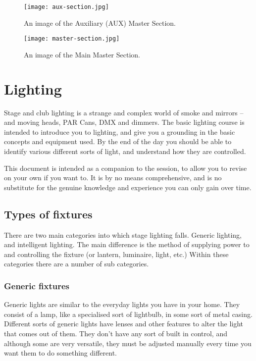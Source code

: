 \documentclass[14pt]{article} %
\let\Oldsection\section
\renewcommand{\section}{\FloatBarrier\Oldsection}
\let\Oldsubsection\subsection
\renewcommand{\subsection}{\FloatBarrier\Oldsubsection}
\let\Oldsubsubsection\subsubsection
\renewcommand{\subsubsection}{\FloatBarrier\Oldsubsubsection}
\begin{document}
\begin{figure}[H]
\begin{center}

\texttt{[image: aux-section.jpg]}
\caption{An image of the Auxiliary (AUX) Master Section.}
\label{fig:aux-section}

\end{center}
\end{figure}

\begin{figure}[H]
\begin{center}

\texttt{[image: master-section.jpg]}
\caption{An image of the Main Master Section.}
\label{fig:master-section}

\end{center}
\end{figure}


\section{Lighting}
\label{lighting}
Stage and club lighting is a strange and complex world of smoke and mirrors – and moving heads, PAR Cans, DMX and dimmers. The basic lighting course is intended to introduce you to lighting, and give you a grounding in the basic concepts and equipment used. By the end of the day you should be able to identify various different sorts of light, and understand how they are controlled.

This document is intended as a companion to the session, to allow you to revise on your own if you want to. It is by no means comprehensive, and is no substitute for the genuine knowledge and experience you can only gain over time.

\subsection{Types of fixtures}
There are two main categories into which stage lighting falls. Generic lighting, and intelligent lighting. The main difference is the method of supplying power to and controlling the fixture (or lantern, luminaire, light, etc.)
Within these categories there are a number of sub categories.

\subsubsection{Generic fixtures}
Generic lights are similar to the everyday lights you have in your home. They consist of a lamp, like a specialised sort of lightbulb, in some sort of metal casing. Different sorts of generic lights have lenses and other features to alter the light that comes out of them. They don’t have any sort of built in control, and although some are very versatile, they must be adjusted manually every time you want them to do something different.
\end{document}
